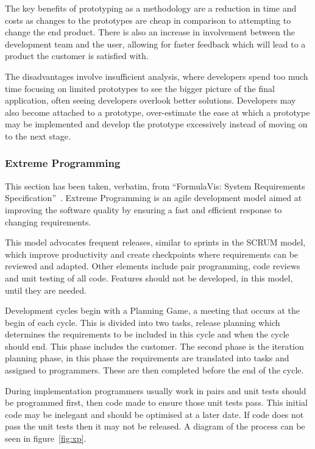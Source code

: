 \documentclass[11pt,a4paper]{article}
\begin{document}
The key benefits of prototyping as a methodology are a reduction in time and costs as changes to the prototypes are cheap in comparison to attempting to change the end product. There is also an increase in involvement between the development team and the user, allowing for faster feedback which will lead to a product the customer is satisfied with.

The disadvantages involve insufficient analysis, where developers spend too much time focusing on limited prototypes to see the bigger picture of the final application, often seeing developers overlook better solutions. Developers may also become attached to a prototype, over-estimate the ease at which a prototype may be implemented and develop the prototype excessively instead of moving on to the next stage.

\subsubsection{Extreme Programming}
This section has been taken, verbatim, from ``FormulaVis: System Requirements Specification''~\cite{formulaVis}. Extreme Programming is an agile development model aimed at improving the software quality by ensuring a fast and efficient response to changing requirements.

This model advocates frequent releases, similar to sprints in the SCRUM model, which improve productivity and create checkpoints where requirements can be reviewed and adapted. Other elements include pair programming, code reviews and unit testing of all code. Features should not be developed, in this model, until they are needed.

Development cycles begin with a Planning Game, a meeting that occurs at the begin of each cycle. This is divided into two tasks, release planning which determines the requirements to be included in this cycle and when the cycle should end. This phase includes the customer. The second phase is the iteration planning phase, in this phase the requirements are translated into tasks and assigned to programmers. These are then completed before the end of the cycle.

During implementation programmers usually work in pairs and unit tests should be programmed first, then code made to ensure those unit tests pass. This initial code may be inelegant and should be optimised at a later date. If code does not pass the unit tests
then it may not be released. A diagram of the process can be seen in figure~\ref{fig:xp}.
\end{document}
